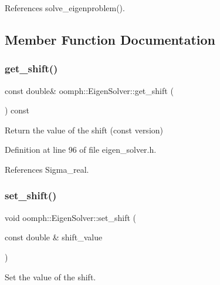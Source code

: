 References solve\+\_\+eigenproblem().



\subsection{Member Function Documentation}
\mbox{\label{classoomph_1_1EigenSolver_ad468f4b075f09cee5efd6ac726ecad6e}} 
\subsubsection{\texorpdfstring{get\+\_\+shift()}{get\_shift()}}
{\footnotesize\ttfamily const double\& oomph\+::\+Eigen\+Solver\+::get\+\_\+shift (\begin{DoxyParamCaption}{ }\end{DoxyParamCaption}) const\hspace{0.3cm}{\ttfamily [inline]}}



Return the value of the shift (const version) 



Definition at line 96 of file eigen\+\_\+solver.\+h.



References Sigma\+\_\+real.

\mbox{\label{classoomph_1_1EigenSolver_a8ab55677b39f98ed8ddb1b1ae682f07b}} 
\subsubsection{\texorpdfstring{set\+\_\+shift()}{set\_shift()}}
{\footnotesize\ttfamily void oomph\+::\+Eigen\+Solver\+::set\+\_\+shift (\begin{DoxyParamCaption}\item[{const double \&}]{shift\+\_\+value }\end{DoxyParamCaption})\hspace{0.3cm}{\ttfamily [inline]}}



Set the value of the shift. 



